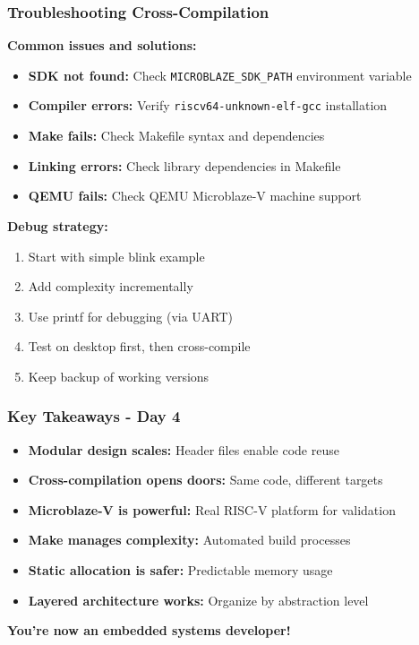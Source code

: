 \documentclass{beamer}
\begin{document}
\begin{frame}
\frametitle{Troubleshooting Cross-Compilation}
\textbf{Common issues and solutions:}

\begin{itemize}
    \item \textbf{SDK not found:} Check \texttt{MICROBLAZE\_SDK\_PATH} environment variable
    \item \textbf{Compiler errors:} Verify \texttt{riscv64-unknown-elf-gcc} installation
    \item \textbf{Make fails:} Check Makefile syntax and dependencies
    \item \textbf{Linking errors:} Check library dependencies in Makefile
    \item \textbf{QEMU fails:} Check QEMU Microblaze-V machine support
\end{itemize}

\vspace{0.5cm}
\textbf{Debug strategy:}
\begin{enumerate}
    \item Start with simple blink example
    \item Add complexity incrementally
    \item Use printf for debugging (via UART)
    \item Test on desktop first, then cross-compile
    \item Keep backup of working versions
\end{enumerate}
\end{frame}

\begin{frame}
\frametitle{Key Takeaways - Day 4}
\begin{itemize}
    \item \textbf{Modular design scales:} Header files enable code reuse
    \item \textbf{Cross-compilation opens doors:} Same code, different targets
    \item \textbf{Microblaze-V is powerful:} Real RISC-V platform for validation
    \item \textbf{Make manages complexity:} Automated build processes
    \item \textbf{Static allocation is safer:} Predictable memory usage
    \item \textbf{Layered architecture works:} Organize by abstraction level
\end{itemize}

\vspace{0.5cm}
\begin{center}
\textbf{You're now an embedded systems developer!}
\end{center}
\end{frame}
\end{document}

